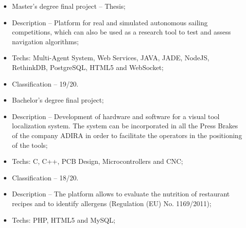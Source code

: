 \documentclass[10pt,a4paper]{altacv}
\begin{document}
\begin{itemize}
  \item Master's degree final project -- Thesis;
  \item Description -- Platform for real and simulated autonomous sailing competitions, which can also be used as a research tool to test and assess navigation algorithms;
  \item Techs: Multi-Agent System, Web Services, JAVA, JADE, NodeJS, RethinkDB, PostgreSQL, HTML5 and WebSocket;
  \item Classification -- 19/20.
\end{itemize}

\divider

%



\begin{itemize}
  \item Bachelor's degree final project;
  \item Description -- Development of hardware and software for a visual tool localization system. The system can be incorporated in all the Press Brakes of the company ADIRA in order to facilitate the operators in the positioning of the tools;
  \item Techs: C, C++, PCB Design, Microcontrollers and CNC;
  \item Classification -- 18/20.
\end{itemize}

\divider

%



\begin{itemize}
  \item Description -- The platform allows to evaluate the nutrition of restaurant recipes and to identify allergens (Regulation (EU) No. 1169/2011);
  \item Techs: PHP, HTML5 and MySQL;
\end{itemize}

\divider

%

\end{document}

